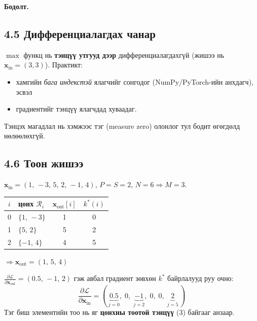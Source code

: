 \documentclass[11pt]{article}
\newenvironment{solution}[1][\textbf{Бодолт.}]
    { \noindent #1 \smallskip \\ }
    { \medskip }
\newcommand{\xin}{\mathbf{x}_{\mathrm{in}}}
\newcommand{\xout}{\mathbf{x}_{\mathrm{out}}}
\newcommand{\dL}[1]{\frac{\partial \mathcal{L}}{\partial #1}}
\begin{document}
\begin{solution}
\subsection*{4.5 Дифференциалагдах чанар}
$\max$ функц нь \textbf{тэнцүү утгууд дээр} дифференциалагдахгүй (жишээ нь
$\xin = (3,3)$). Практикт:
\begin{itemize}[leftmargin=*]
  \item хамгийн \emph{бага индекстэй} ялагчийг сонгодог (NumPy/PyTorch-ийн анхдагч), эсвэл
  \item градиентийг тэнцүү ялагчдад хуваадаг.
\end{itemize}
Тэнцэх магадлал нь хэмжээс тэг (measure zero) олонлог тул бодит өгөгдөлд нөлөөлөхгүй.

\subsection*{4.6 Тоон жишээ}
$\xin = (1,\,-3,\,5,\,2,\,-1,\,4)$, \quad $P = S = 2$, \quad $N=6 \Rightarrow M=3$.

\begin{center}
\begin{tabular}{clcc}
\toprule
$i$ & цонх $\mathcal{R}_i$ & $\xout[i]$ & $k^{*}(i)$ \\
\midrule
0 & $\{1,\,-3\}$  & 1 & 0 \\
1 & $\{5,\,2\}$   & 5 & 2 \\
2 & $\{-1,\,4\}$  & 4 & 5 \\
\bottomrule
\end{tabular}
\end{center}
$\Longrightarrow \xout = (1,\,5,\,4)$

\medskip
$\dL{\xout} = (0.5,\,-1,\,2)$ гэж авбал градиент зөвхөн $k^{*}$ байрлалууд руу очно:
\[
\dL{\xin} = (\,\underbrace{0.5}_{j=0},\; 0,\; \underbrace{-1}_{j=2},\; 0,\; 0,\; \underbrace{2}_{j=5}\,)
\]
Тэг биш элементийн тоо нь яг \textbf{цонхны тоотой тэнцүү} (3) байгааг анзаар.


\end{solution}
\end{document}

